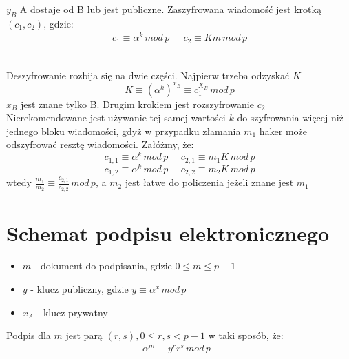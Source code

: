 \documentclass[12pt,a4paper]{article}
\begin{document}
 $y_{B}$ A dostaje od B lub jest publiczne. Zaszyfrowana wiadomość jest krotką $(c_{1}, c_{2})$, gdzie:
 \begin{gather}
     c_{1} \equiv \alpha^{k}\,mod\,p\;\:\:\:\:\;c_{2} \equiv Km\,mod\,p
 \end{gather}
 
 \\
 Deszyfrowanie rozbija się na dwie części. Najpierw trzeba odzyskać $K$ \[K\equiv (\alpha^{k})^{x_{B}}\equiv c_{1}^{X_{B}}\,mod\,p\]
 $x_{B}$ jest znane tylko B. Drugim krokiem jest rozszyfrowanie $c_{2}$
 \\
 Nierekomendowane jest używanie tej samej wartości $k$ do szyfrowania więcej niż jednego bloku wiadomości, gdyż
 w przypadku złamania $m_{1}$ haker może odszyfrować resztę wiadomości. Załóżmy, że:
 \[c_{1,1}\equiv \alpha^{k}\,mod\,p \:\:\:\:\:\: c_{2,1}\equiv m_{1}K\,mod\,p\]
 \[c_{1,2}\equiv \alpha^{k}\,mod\,p \:\:\:\:\:\: c_{2,2}\equiv m_{2}K\,mod\,p\]
 wtedy $\frac{m_{1}}{m_{2}} \equiv \frac{c_{2,1}}{c_{2,2}}\,mod\,p$, a $m_{2}$ jest łatwe do policzenia jeżeli znane jest $m_{1}$
\section{Schemat podpisu elektronicznego}
\begin{itemize}
    \item $m$ - dokument do podpisania, gdzie $0\leq m \leq p-1$
    \item $y$ - klucz publiczny, gdzie $y \equiv \alpha^{x}\,mod\,p$
    \item $x_{A}$ - klucz prywatny
\end{itemize}
Podpis dla $m$ jest parą $(r,s), 0\leq r,s < p-1$ w taki sposób, że: 
\begin{gather}
   \alpha^{m} \equiv y^{r}r^{s}\,mod\,p \:\:\: 
\end{gather}
\end{document}
